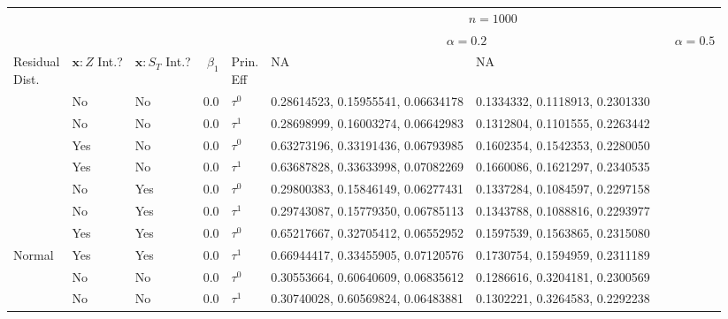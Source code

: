 
\begin{tabular}[t]{lllrlll}
\toprule
\multicolumn{5}{c}{ } & \multicolumn{6}{c}{$n=1000$} \\
\cmidrule(l{3pt}r{3pt}){6-11}
\multicolumn{5}{c}{ } & \multicolumn{3}{c}{$\alpha=0.2$} & \multicolumn{3}{c}{$\alpha=0.5$} \\
\cmidrule(l{3pt}r{3pt}){6-8} \cmidrule(l{3pt}r{3pt}){9-11}
\makecell[l]{Residual\\Dist.} & \makecell[l]{$\bm{x}:Z$\\Int.?} & \makecell[l]{$\bm{x}:S_T$\\Int.?} & $\beta_1$ & \makecell[l]{Prin.\\Eff} & NA & NA\\
\midrule
 & No & No & 0.0 & $\tau^0$ & 0.28614523, 0.15955541, 0.06634178 & 0.1334332, 0.1118913, 0.2301330\\

 & No & No & 0.0 & $\tau^1$ & 0.28698999, 0.16003274, 0.06642983 & 0.1312804, 0.1101555, 0.2263442\\

 & Yes & No & 0.0 & $\tau^0$ & 0.63273196, 0.33191436, 0.06793985 & 0.1602354, 0.1542353, 0.2280050\\

 & Yes & No & 0.0 & $\tau^1$ & 0.63687828, 0.33633998, 0.07082269 & 0.1660086, 0.1621297, 0.2340535\\

 & No & Yes & 0.0 & $\tau^0$ & 0.29800383, 0.15846149, 0.06277431 & 0.1337284, 0.1084597, 0.2297158\\

 & No & Yes & 0.0 & $\tau^1$ & 0.29743087, 0.15779350, 0.06785113 & 0.1343788, 0.1088816, 0.2293977\\

 & Yes & Yes & 0.0 & $\tau^0$ & 0.65217667, 0.32705412, 0.06552952 & 0.1597539, 0.1563865, 0.2315080\\

\multirow{-8}{*}{\raggedright\arraybackslash Normal} & Yes & Yes & 0.0 & $\tau^1$ & 0.66944417, 0.33455905, 0.07120576 & 0.1730754, 0.1594959, 0.2311189\\
\cmidrule{1-7}
 & No & No & 0.0 & $\tau^0$ & 0.30553664, 0.60640609, 0.06835612 & 0.1286616, 0.3204181, 0.2300569\\

 & No & No & 0.0 & $\tau^1$ & 0.30740028, 0.60569824, 0.06483881 & 0.1302221, 0.3264583, 0.2292238\\


\end{tabular}
